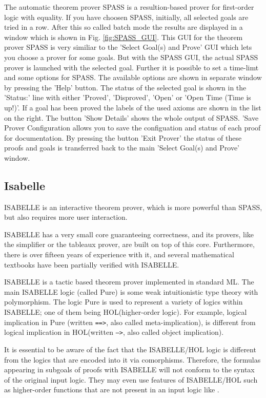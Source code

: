 \documentclass{article}
\newcommand{\normalTEXTSC}[2]{{#1\scriptsize#2}}
\newcommand     {\HOL}{\normalTEXTSC{H}{OL}\xspace}
\newcommand     {\Isabelle}{\normalTEXTSC{I}{SABELLE}\xspace}
\begin{document}
The automatic theorem prover SPASS
\cite{WeidenbachEtAl02} is a resultion-based prover for first-order logic
with equality. 
If you have choosen SPASS, initially, all selected goals are tried in a
row. After this so called batch mode the results are displayed in a
window which is shown in Fig. \ref{fig:SPASS_GUI}. This GUI for the
theorem prover SPASS is very similiar to the 'Select Goal(s) and
Prove' GUI which lets you choose a prover for some goals. But with the
SPASS GUI, the actual SPASS prover is launched with the selected
goal. Further it is possible to set a time-limt and some options for
SPASS. The available options are shown in separate window by pressing
the 'Help' button. The status of the selected goal is shown in the
'Status:' line with either 'Proved', 'Disproved', 'Open' or 'Open Time
(Time is up!)'. If a goal has been proved the labels of the used
axioms are shown in the list on the right. The button 'Show Details'
shows the whole output of SPASS. 'Save Prover Configuration allows you
to save the configuation and status of each proof for
documentation. By pressing the button 'Exit Prover' the status of
these proofs and goals is transferred back to the main 'Select Goal(s)
and Prove' window.

\subsection*{Isabelle}

\Isabelle \cite{NipPauWen02} is an interactive theorem prover, which is
more powerful than SPASS, but also requires more user interaction.

\Isabelle 
has a very small core guaranteeing correctness, and its provers,
like the simplifier or the tableaux prover, are built on top of this
core. Furthermore, there is over fifteen years of experience with it,
and several mathematical textbooks have been partially 
verified with
\Isabelle. 

\Isabelle is a tactic based theorem prover implemented in standard ML.
The main \Isabelle logic (called Pure) is some weak intuitionistic type
theory with polymorphism. The logic Pure is used to represent a
variety of logics within \Isabelle; one of them being \HOL (higher-order
logic).  For example, logical implication in Pure (written
\texttt{==>}, also called meta-implication), is different from logical
implication in \HOL (written \texttt{-->}, also called object
implication).

It is essential to be aware of the fact that the \Isabelle/\HOL logic
is different from the logics that are encoded into it via comorphisms.
Therefore, the formulas appearing in subgoals of proofs with \Isabelle
will not conform to the syntax of the original input logic.  They may
even use features of \Isabelle/\HOL such as higher-order functions
that are not present in an input logic like \CASL.
\end{document}
